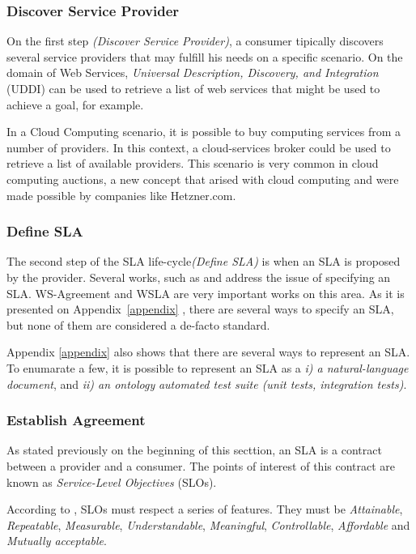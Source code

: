 \subsubsection{Discover Service Provider}
On the first step \textit{(Discover Service Provider)}, a consumer tipically discovers several service providers that may fulfill his needs on a specific scenario. On the domain of Web Services, \textit{Universal Description, Discovery, and Integration} (UDDI) can be used to retrieve a list of web services that might be used to achieve a goal, for example. 

In a Cloud Computing scenario, it is possible to buy computing services from a number of providers. In this context, a cloud-services broker could be used to retrieve a list of available providers. This scenario is very common in cloud computing auctions, a new concept that arised with cloud computing and were made possible by companies like Hetzner.com.

\subsubsection{Define SLA}
The second step of the SLA life-cycle\textit{(Define SLA)} is when an SLA is proposed by the provider. Several works, such as \cite{6846456} and \cite{kouki:hal-00675077} address the issue of specifying an SLA. WS-Agreement \cite{citeulike:2805191} and WSLA \cite{4578560} are very important works on this area. As it is presented on Appendix~\ref{appendix} , there are several ways to specify an SLA, but none of them are considered a de-facto standard. 

Appendix \ref{appendix} also shows that there are several ways to represent an SLA. To enumarate a few, it is possible to represent an SLA as a \textit{i) a natural-language document}, and \textit{ii) an ontology} \textit{automated test suite (unit tests, integration tests)}.

\subsubsection{Establish Agreement}

As stated previously on the beginning of this secttion, an SLA is a contract between a provider and a consumer. The points of interest of this contract are known as \textit{Service-Level Objectives} (SLOs).

According to \cite{sturm2000foundations}, SLOs must respect a series of features. They must be \textit{Attainable},  \textit{Repeatable},  \textit{Measurable},  \textit{Understandable},  \textit{Meaningful},  \textit{Controllable},  \textit{Affordable} and \textit{Mutually acceptable}. 


